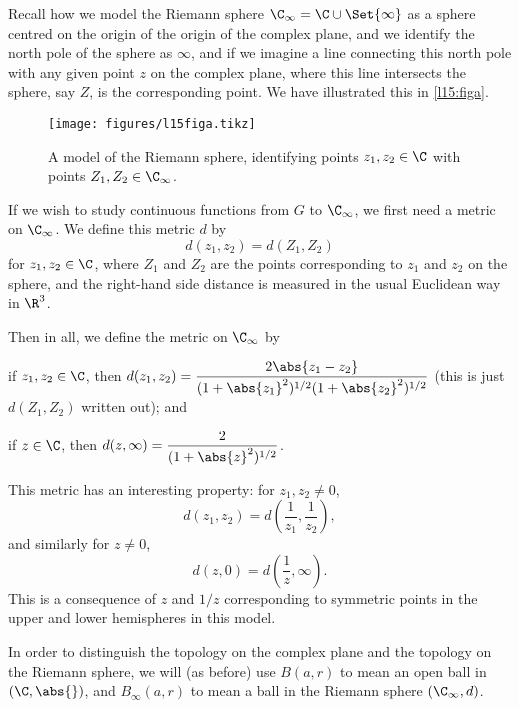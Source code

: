 


Recall how we model the Riemann sphere $\C_\infty = \C \cup \Set{\infty}$ as a sphere centred on the origin of the origin of the complex plane, and we identify the north pole of the sphere as $\infty$, and if we imagine a line connecting this north pole with any given point $z$ on the complex plane, where this line intersects the sphere, say $Z$, is the corresponding point.
We have illustrated this in \autoref{l15:figa}.

\begin{figure}
	\centering
	\texttt{[image: figures/l15figa.tikz]}

	\caption{\label{l15:figa} A model of the Riemann sphere, identifying points $z_1, z_2 \in \C$ with points $Z_1, Z_2 \in \C_\infty$.}
\end{figure}

If we wish to study continuous functions from $G$ to $\C_\infty$, we first need a metric on $\C_\infty$.
We define this metric $d$ by
\[
	d(z_1, z_2) = d(Z_1, Z_2)
\]
for $z_1, z_2 \in \C$, where $Z_1$ and $Z_2$ are the points corresponding to $z_1$ and $z_2$ on the sphere, and the right-hand side distance is measured in the usual Euclidean way in $\R^3$.

Then in all, we define the metric on $\C_\infty$ by
\begin{items}
	\item\label{ddefi} if $z_1, z_2 \in \C$, then $\displaystyle d(z_1, z_2) = \frac{2 \abs{z_1 - z_2}}{(1 + \abs{z_1}^2)^{1/2} (1 + \abs{z_2}^2)^{1/2}}$ (this is just $d(Z_1, Z_2)$ written out); and
	\item if $z \in \C$, then $\displaystyle d(z, \infty) = \frac{2}{(1 + \abs{z}^2)^{1/2}}$.
\end{items}

This metric has an interesting property:
for $z_1, z_2 \neq 0$,
\[
	d(z_1, z_2) = d\left ( \frac{1}{z_1}, \frac{1}{z_2} \right ),
\]
and similarly for $z \neq 0$,
\[
	d(z, 0) = d \left ( \frac{1}{z}, \infty \right ).
\]
This is a consequence of $z$ and $1/z$ corresponding to symmetric points in the upper and lower hemispheres in this model.

\begin{remark}
	In order to distinguish the topology on the complex plane and the topology on the Riemann sphere, we will (as before) use $B(a, r)$ to mean an open ball in $(\C, \abs{})$, and $B_\infty(a, r)$ to mean a ball in the Riemann sphere $(\C_\infty, d)$.
\end{remark}

